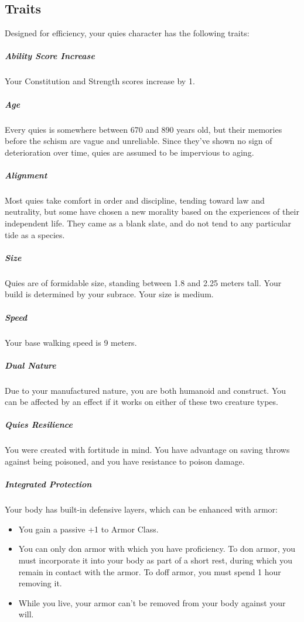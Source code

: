 \subsection*{Traits}
    Designed for efficiency, your quies character has the following traits:

    \subparagraph{Ability Score Increase} Your Constitution and Strength scores increase by 1.

    \subparagraph{Age} Every quies is somewhere between 670 and 890 years old, but their memories before the schism are vague and unreliable.
    Since they've shown no sign of deterioration over time, quies are assumed to be impervious to aging.

    \subparagraph{Alignment} Most quies take comfort in order and discipline, tending toward law and neutrality, but some have chosen a new morality based on the experiences of their independent life.
    They came as a blank slate, and do not tend to any particular tide as a species.

    \subparagraph{Size} Quies are of formidable size, standing between 1.8 and 2.25 meters tall.
    Your build is determined by your subrace.
    Your size is medium.

    \subparagraph{Speed} Your base walking speed is 9 meters.

    \subparagraph{Dual Nature} Due to your manufactured nature, you are both humanoid and construct.
    You can be affected by an effect if it works on either of these two creature types.

    \subparagraph{Quies Resilience} You were created with fortitude in mind.
    You have advantage on saving throws against being poisoned, and you have resistance to poison damage.

    \subparagraph{Integrated Protection} Your body has built-in defensive layers, which can be enhanced with armor:

    \begin{itemize}
        \item You gain a passive +1 to Armor Class.
        \item You can only don armor with which you have proficiency.
        To don armor, you must incorporate it into your body as part of a short rest, during which you remain in contact with the armor.
        To doff armor, you must spend 1 hour removing it.
        \item While you live, your armor can't be removed from your body against your will.
    \end{itemize}

